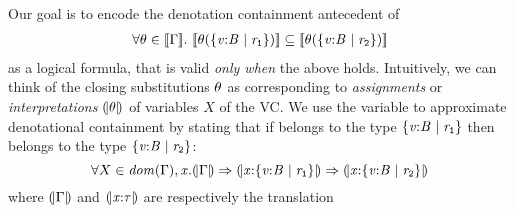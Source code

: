 Our goal is to encode the denotation containment antecedent of \rtdsub
%
\begin{align}\label{denotcont}
\forall \theta\in [\![\Gamma]\!].\  
  		 [\![\theta({\{ \mathtt{\mathit{v}}\text{:}\mathtt{\mathit{B}^{}} \mid \mathtt{\mathit{r}_1} \}})]\!] 
  		\subseteq   [\![\theta({\{ \mathtt{\mathit{v}}\text{:}\mathtt{\mathit{B}^{}} \mid \mathtt{\mathit{r}_2} \}})]\!]
\end{align}
as a logical formula, that is valid \emph{only when} the above holds.
Intuitively, we can think of the closing substitutions $\theta$ as 
corresponding to \emph{assignments} or \emph{interpretations} 
$(\!|\theta|\!)$ 
of variables $X$ of the VC.
%
We use the variable \x to approximate denotational containment 
by stating that  
if \x belongs to the type ${\{ \mathtt{\mathit{v}}\text{:}\mathtt{\mathit{B}^{}} \mid \mathtt{\mathit{r}_1} \}}$
then \x belongs to the type ${\{ \mathtt{\mathit{v}}\text{:}\mathtt{\mathit{B}^{}} \mid \mathtt{\mathit{r}_2} \}}$:
$$
\forall X \in \mathit{dom}(\Gamma), \mathit{x}. 
    (\!|\Gamma|\!)\Rightarrow 
  		 {\ensuremath{(\!|\mathtt{\mathit{x}}\text{:}\mathtt{{\{ \mathtt{\mathit{v}}\text{:}\mathtt{\mathit{B}^{}} \mid \mathtt{\mathit{r}_1} \}}}|\!)}} 
  		\Rightarrow (\!|\mathtt{\mathit{x}}\text{:}\mathtt{{\{ \mathtt{\mathit{v}}\text{:}\mathtt{\mathit{B}^{}} \mid \mathtt{\mathit{r}_2} \}}}|\!)
$$
where $(\!|\Gamma|\!)$ and $(\!|\mathtt{\mathit{x}}\text{:}\mathtt{\mathit{\tau}}|\!)$ are respectively the translation 
